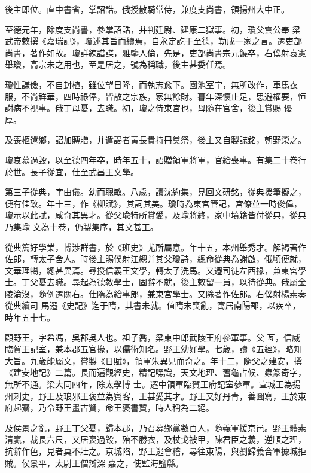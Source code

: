 \begin{pinyinscope}
 後主即位。直中書省，掌詔誥。俄授散騎常侍，兼度支尚書，領揚州大中正。



 至德元年，除度支尚書，參掌詔誥，并判廷尉、建康二獄事。初，瓊父雲公奉
 梁武帝敕撰《嘉瑞記》，瓊述其旨而續焉，自永定訖于至德，勒成一家之言。遷吏部尚書，著作如故。瓊詳練譜諜，雅鑒人倫，先是，吏部尚書宗元饒卒，右僕射袁憲舉瓊，高宗未之用也，至是居之，號為稱職，後主甚委任焉。



 瓊性謙儉，不自封植，雖位望日隆，而執志愈下。園池室宇，無所改作，車馬衣服，不尚鮮華，四時祿俸，皆散之宗族，家無餘財。暮年深懷止足，思避權要，恒謝病不視事。俄丁母憂，去職。初，瓊之侍東宮也，母隨在官舍，後主賞賜
 優厚。



 及喪柩還鄉，詔加賻贈，并遣謁者黃長貴持冊奠祭，後主又自製誌銘，朝野榮之。



 瓊哀慕過毀，以至德四年卒，時年五十，詔贈領軍將軍，官給喪事。有集二十卷行於世。長子從宜，仕至武昌王文學。



 第三子從典，字由儀。幼而聰敏。八歲，讀沈約集，見回文研銘，從典援筆擬之，便有佳致。年十三，作《柳賦》，其詞其美。瓊時為東宮管記，宮僚並一時俊偉，瓊示以此賦，咸奇其異才。從父瑜特所賞愛，及瑜將終，家中墳籍皆付從典，從典乃集瑜
 文為十卷，仍製集序，其文甚工。



 從典篤好學業，博涉群書，於《班史》尤所屬意。年十五，本州舉秀才。解褐著作佐郎，轉太子舍人。時後主賜僕射江總并其父瓊詩，總命從典為謝啟，俄頃便就，文華理暢，總甚異焉。尋授信義王文學，轉太子洗馬。又遷司徒左西掾，兼東宮學士。丁父憂去職。尋起為德教學士，固辭不就，後主敕留一員，以待從典。俄屬金陵淪沒，隨例遷關右。仕隋為給事郎，兼東宮學士。又除著作佐郎。右僕射楊素奏從典續司
 馬遷《史記》迄于隋，其書未就。值隋末喪亂，寓居南陽郡，以疾卒，時年五十七。



 顧野王，字希馮，吳郡吳人也。祖子喬，梁東中郎武陵王府參軍事。父亙，信威臨賀王記室，兼本郡五官掾，以儒術知名。野王幼好學。七歲，讀《五經》，略知大旨。九歲能屬文，嘗製《日賦》，領軍朱異見而奇之。年十二，隨父之建安，撰《建安地記》二篇。長而遍觀經史，精記嘿識，天文地理、蓍龜占候、蟲篆奇字，無所不通。梁大同四年，除太學博
 士。遷中領軍臨賀王府記室參軍。宣城王為揚州刺史，野王及琅邪王褒並為賓客，王甚愛其才。野王又好丹青，善圖寫，王於東府起齋，乃令野王畫古賢，命王褒書贊，時人稱為二絕。



 及侯景之亂，野王丁父憂，歸本郡，乃召募鄉黨數百人，隨義軍援京邑。野王體素清羸，裁長六尺，又居喪過毀，殆不勝衣，及杖戈被甲，陳君臣之義，逆順之理，抗辭作色，見者莫不壯之。京城陷，野王逃會稽，尋往東陽，與劉歸義合軍據城拒賊。侯景平，太尉王僧辯深
 嘉之，使監海鹽縣。




\end{pinyinscope}
